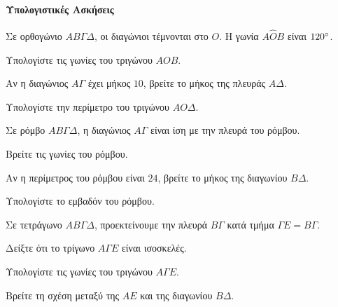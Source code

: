 \documentclass[11pt,a4paper,modern]{FFExercises}
\begin{document}

\paragraph{Υπολογιστικές Ασκήσεις}

\askhsh
Σε ορθογώνιο $ΑΒ\varGamma\Delta$, οι διαγώνιοι τέμνονται στο $Ο$. Η γωνία $Α\hat{Ο}Β$ είναι $120\degree$.
\begin{alist}
    \item Υπολογίστε τις γωνίες του τριγώνου $ΑΟΒ$.
    \item Αν η διαγώνιος $Α\varGamma$ έχει μήκος $10$, βρείτε το μήκος της πλευράς $Α\Delta$.
    \item Υπολογίστε την περίμετρο του τριγώνου $ΑΟ\Delta$.
\end{alist}

\begin{center}
\end{center}

\askhsh
Σε ρόμβο $ΑΒ\varGamma\Delta$, η διαγώνιος $Α\varGamma$ είναι ίση με την πλευρά του ρόμβου.
\begin{alist}
    \item Βρείτε τις γωνίες του ρόμβου.
    \item Αν η περίμετρος του ρόμβου είναι $24$, βρείτε το μήκος της διαγωνίου $Β\Delta$.
    \item Υπολογίστε το εμβαδόν του ρόμβου.
\end{alist}

\askhsh
Σε τετράγωνο $ΑΒ\varGamma\Delta$, προεκτείνουμε την πλευρά $Β\varGamma$ κατά τμήμα $\varGamma Ε = Β\varGamma$.
\begin{alist}
    \item Δείξτε ότι το τρίγωνο $Α\varGamma E$ είναι ισοσκελές.
    \item Υπολογίστε τις γωνίες του τριγώνου $Α\varGamma E$.
    \item Βρείτε τη σχέση μεταξύ της $ΑΕ$ και της διαγωνίου $Β\Delta$.
\end{alist}
\end{document}
